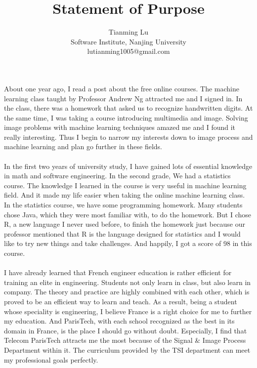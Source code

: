 \documentclass[a4paper]{article}
\title{Statement of Purpose}
\author{Tianming Lu \\
		Software Institute, Nanjing University\\
		lutianming1005@gmail.com}
\date{}
\begin{document}
\maketitle
\paragraph{}
About one year ago, I read a post about the free online courses. The machine learning class taught by Professor Andrew Ng attracted me and I signed in. In the class, there was a homework that asked us to recognize handwritten digits. At the same time, I was taking a course introducing multimedia and image. Solving image problems with machine learning techniques amazed me and I found it really interesting. Thus I begin to narrow my interests down to image process and machine learning and plan go further in these fields.
\paragraph{}
In the first two years of university study, I have gained lots of essential knowledge in math and software engineering. In the second grade, We had a statistics course. The knowledge I learned in the course is very useful in machine learning field. And it made my life easier when taking the online machine learning class. In the statistics course, we have some programming homework. Many students chose Java, which they were most familiar with, to do the homework. But I chose R, a new language I never used before, to finish the homework just because our professor mentioned that R is the language designed for statistics and I would like to try new things and take challenges. And happily, I got a score of 98 in this course.
\paragraph{}
I have already learned that French engineer education is rather efficient for training an elite in engineering. Students not only learn in class, but also learn in company. The theory and practice are highly combined with each other, which is proved to be an efficient way to learn and teach. As a result, being a student whose speciality is engineering, I believe France is a right choice for me to further my education. And ParisTech, with each school recognized as the best in its domain in France, is the place I should go without doubt. Especially, I find that Telecom ParisTech attracts me the most because of the Signal \& Image Process Department within it. The curriculum provided by the TSI department can meet my professional goals perfectly.
\end{document}
